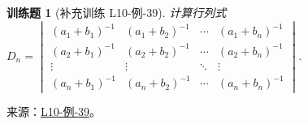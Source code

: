 \documentclass[UTF8,12pt,a4paper,fontset=fandol]{ctexart}
\newtheorem{exercise}{训练题}[section]
\begin{document}
\begin{exercise}[补充训练 L10-例-39]\label{prob:L10-例-39}
计算行列式 $D_n=\begin{vmatrix}
            (a_1+b_1)^{-1} & (a_1+b_2)^{-1} & \cdots & (a_1+b_n)^{-1} \\
            (a_2+b_1)^{-1} & (a_2+b_2)^{-1} & \cdots & (a_2+b_n)^{-1} \\
            \vdots         & \vdots         & \ddots & \vdots         \\
            (a_n+b_1)^{-1} & (a_n+b_2)^{-1} & \cdots & (a_n+b_n)^{-1}
        \end{vmatrix}$.
\end{exercise}
\noindent 来源：\href{https://github.com/yhwu-is/Linear-Algebra-Left-Undone/blob/new/%E8%AE%B2%E4%B9%89/%E4%B8%93%E9%A2%98/10%20%E8%A1%8C%E5%88%97%E5%BC%8F.tex}{L10-例-39}。
\end{document}
